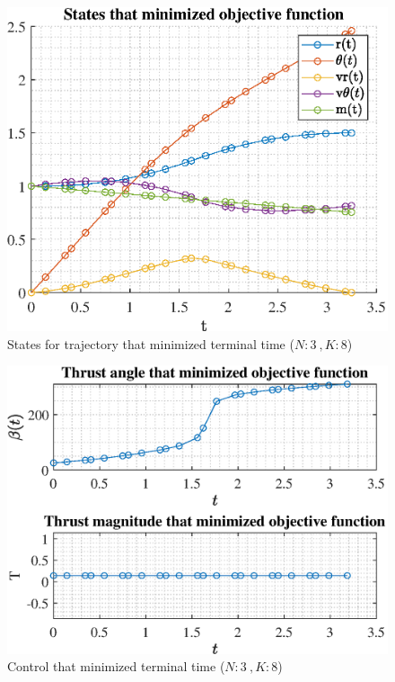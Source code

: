 \documentclass[]{article}
\begin{document}
\begin{figure}
	\centering
	\includegraphics[scale=0.75]{states_N3_K8_C2_tf.eps}
	\caption{States for trajectory that minimized terminal time (\(N:3\ , K:8\))}
	\label{fig:states_N3_K8_C2_tf}
\end{figure}
\begin{figure}
	\centering
	\includegraphics[scale=0.75]{control_N3_K8_C2_tf.eps}
	\caption{Control that minimized terminal time (\(N:3\ , K:8\))}
	\label{fig:control_N3_K8_C2_tf}
\end{figure}
\end{document}
